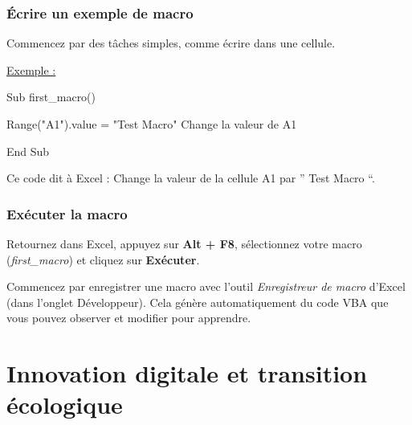 \documentclass[
  letterpaper,
  DIV=11,
  numbers=noendperiod]{scrartcl}
\newenvironment{Shaded}{\begin{snugshade}}{\end{snugshade}}
\newcommand{\NormalTok}[1]{\textcolor[rgb]{0.00,0.23,0.31}{#1}}
\begin{document}
\subsubsection{Écrire un exemple de
macro}\label{uxe9crire-un-exemple-de-macro}

Commencez par des tâches simples, comme écrire dans une cellule.

\ul{Exemple :}

\begin{Shaded}
\begin{Highlighting}[]
\NormalTok{Sub first\_macro()}

\NormalTok{  Range("A1").value = "Test Macro" \textquotesingle{} Change la valeur de A1}

\NormalTok{End Sub}
\end{Highlighting}
\end{Shaded}

Ce code dit à Excel : Change la valeur de la cellule A1 par '' Test
Macro ``.

\subsubsection{Exécuter la macro}\label{exuxe9cuter-la-macro}

Retournez dans Excel, appuyez sur \textbf{Alt + F8}, sélectionnez votre
macro (\emph{first\_macro}) et cliquez sur \textbf{Exécuter}.

\begin{tcolorbox}[enhanced jigsaw, colback=white, opacitybacktitle=0.6, coltitle=black, title=\textcolor{quarto-callout-tip-color}{\faLightbulb}\hspace{0.5em}{Tip}, bottomrule=.15mm, leftrule=.75mm, arc=.35mm, breakable, toprule=.15mm, colbacktitle=quarto-callout-tip-color!10!white, colframe=quarto-callout-tip-color-frame, rightrule=.15mm, titlerule=0mm, bottomtitle=1mm, toptitle=1mm, left=2mm, opacityback=0]

Commencez par enregistrer une macro avec l'outil \emph{Enregistreur de
macro} d'Excel (dans l'onglet Développeur). Cela génère automatiquement
du code VBA que vous pouvez observer et modifier pour apprendre.

\end{tcolorbox}

\section{Innovation digitale et transition
écologique}\label{innovation-digitale-et-transition-uxe9cologique}
\end{document}
